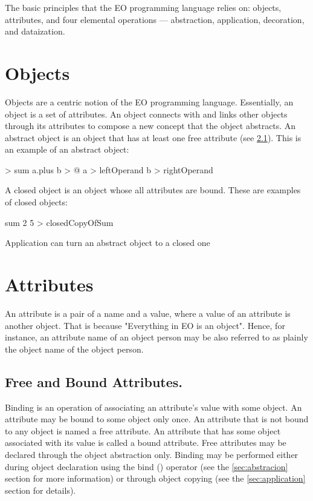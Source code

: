 \documentclass[12pt]{book}
\begin{document}
The basic principles that the EO programming language relies on: objects, attributes, and four elemental operations — abstraction, application, decoration, and dataization.

\section{Objects} \label{sec:objects}
Objects are a centric notion of the EO programming language. Essentially, an object is a set of attributes. An object connects with and links other objects through its attributes to compose a new concept that the object abstracts.
An abstract object is an object that has at least one free attribute (see \ref{subsec:free-bound-attr}).
This is an example of an abstract object:

\begin{ffcode}
[a b] > sum
  a.plus b > @
  a > leftOperand
  b > rightOperand
\end{ffcode}
A closed object is an object whose all attributes are bound.
These are examples of closed objects:

\begin{ffcode}
sum 2 5 > closedCopyOfSum
\end{ffcode}
Application can turn an abstract object to a closed one


\section{Attributes}
An attribute is a pair of a name and a value, where a value of an attribute is another object. That is because "Everything in EO is an object". Hence, for instance, an attribute name of an object person may be also referred to as plainly the object name of the object person.

\subsection{Free and Bound Attributes.} \label{subsec:free-bound-attr}
Binding is an operation of associating an attribute's value with some object. An attribute may be bound to some object only once.
An attribute that is not bound to any object is named a free attribute. An attribute that has some object associated with its value is called a bound attribute.
Free attributes may be declared through the object abstraction only. Binding may be performed either during object declaration using the bind (\ff{>}) operator (see the \ref{sec:abstracion} section for more information) or through object copying (see the \ref{sec:application} section for details).
\end{document}
